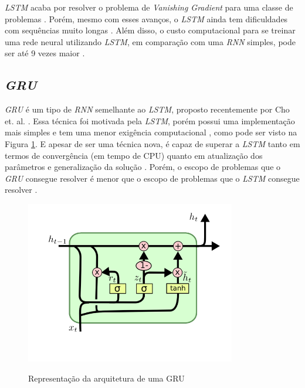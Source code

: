 \textit{\acrshort{LSTM}} acaba por resolver o problema de \textit{Vanishing Gradient} para uma classe de problemas \cite{doi:10.1162/neco.1997.9.8.1735}. Porém, mesmo com esses avanços, o \textit{\acrshort{LSTM}} ainda tem dificuldades com sequências muito longas \cite{alex2012}. Além disso, o custo computacional para se treinar uma rede neural utilizando \textit{\acrshort{LSTM}}, em comparação com uma \textit{\acrshort{RNN}} simples, pode ser até 9 vezes maior \cite{doi:10.1162/neco.1997.9.8.1735}.

\subsection{\textit{\acrfull{GRU}}}

\textit{\acrshort{GRU}} é um tipo de \textit{\acrshort{RNN}} semelhante ao \textit{\acrshort{LSTM}}, proposto recentemente por Cho et. al. \cite{cho2014}. Essa técnica foi motivada pela \textit{\acrshort{LSTM}}, porém possui uma implementação mais simples e tem uma menor exigência computacional \cite{cho2014}, como pode ser visto na Figura \ref{figure:gru}. E apesar de ser uma técnica nova, é capaz de superar a \textit{\acrshort{LSTM}} tanto em termos de convergência (em tempo de CPU) quanto em atualização dos parâmetros e generalização da solução \cite{chung2014empirical}. Porém, o escopo de problemas que o \textit{\acrshort{GRU}} consegue resolver é menor que o escopo de problemas que o \textit{\acrshort{LSTM}} consegue resolver \cite{weiss2018}.

\begin{figure}[htbp]
    \centering
    \includegraphics[scale=0.8]{monography/img/models/GRU.png}
    \label{figure:gru}
    \caption[Representação da arquitetura de uma GRU]{Representação da arquitetura de uma GRU\footnotemark}
\end{figure}

